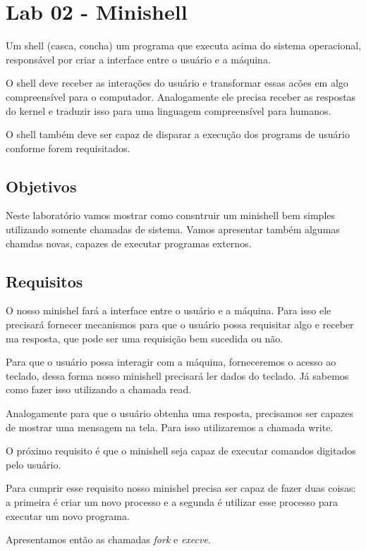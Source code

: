 \chapter{Lab 02 - Minishell}

Um shell (casca, concha) um programa que executa acima do sistema operacional, responsável por criar a interface entre o usuário e a máquina.

O shell deve receber as interações do usuário e transformar essas acões em algo compreensível para o computador. Analogamente ele precisa receber as respostas do kernel e traduzir isso para uma linguagem compreensível para humanos.

O shell também deve ser capaz de disparar a execução dos programs de usuário conforme forem requisitados.

\section{Objetivos}

Neste laboratório vamos mostrar como consntruir um minishell bem simples utilizando somente chamadas de sistema. Vamos apresentar também algumas chamdas novas, capazes de executar programas externos.

\section{Requisitos}

O nosso minishel fará a interface entre o usuário e a máquina. Para isso ele precisará fornecer mecanismos para que o usuário possa requisitar algo e receber ma resposta, que pode ser uma requisição bem sucedida ou não.

Para que o usuário possa interagir com a máquina, forneceremos o acesso ao teclado, dessa forma nosso minishell precisará ler dados do teclado. Já sabemos como fazer isso utilizando a chamada read.

Analogamente para que o usuário obtenha uma resposta, precisamos ser capazes de mostrar uma mensagem na tela. Para isso utilizaremos a chamada write.

O próximo requisito é que o minishell seja capaz de executar comandos digitados pelo usuário.

Para cumprir esse requisito nosso minishel precisa ser capaz de fazer duas coisas: a primeira é criar um novo processo e a segunda é utilizar esse processo para executar um novo programa.

Apresentamos então as chamadas \emph{fork} e \emph{execve}.

